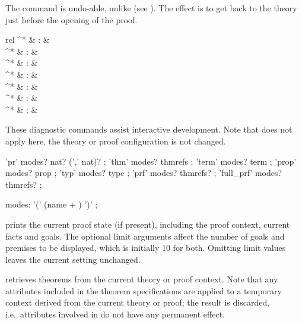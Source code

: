 \begin{isabellebody}
\begin{isamarkuptext}
  \medskip The \mbox{} command is undo-able, unlike
  \mbox{} (see ).  The effect is to
  get back to the theory just before the opening of the proof.%
\end{isamarkuptext}%
\isamarkuptrue%
%
\isamarkuptrue%
%
\isamarkuptrue%
%
\begin{isamarkuptext}%
\begin{matharray}{rcl}
    ^* & : & \isarkeep{\cdot} \\
    ^* & : &  \\
    ^* & : &  \\
    ^* & : &  \\
    ^* & : &  \\
    ^* & : &  \\
    ^* & : &  \\
  \end{matharray}

  These diagnostic commands assist interactive development.  Note that
  \mbox{} does not apply here, the theory or proof
  configuration is not changed.

  \begin{rail}
    'pr' modes? nat? (',' nat)?
    ;
    'thm' modes? thmrefs
    ;
    'term' modes? term
    ;
    'prop' modes? prop
    ;
    'typ' modes? type
    ;
    'prf' modes? thmrefs?
    ;
    'full\_prf' modes? thmrefs?
    ;

    modes: '(' (name + ) ')'
    ;
  \end{rail}

  \begin{descr}

  \item [\mbox{\isa{\isacommand{pr}}}~\isa{goals{\isacharcomma}\ prems}] prints the current
  proof state (if present), including the proof context, current facts
  and goals.  The optional limit arguments affect the number of goals
  and premises to be displayed, which is initially 10 for both.
  Omitting limit values leaves the current setting unchanged.

  \item [\mbox{\isa{\isacommand{thm}}}~\isa{a\isactrlsub {\isadigit{1}}\ {\isasymdots}\ a\isactrlsub n}] retrieves
  theorems from the current theory or proof context.  Note that any
  attributes included in the theorem specifications are applied to a
  temporary context derived from the current theory or proof; the
  result is discarded, i.e.\ attributes involved in  do not have any permanent effect.


\end{descr}
\end{isamarkuptext}
\end{isabellebody}
